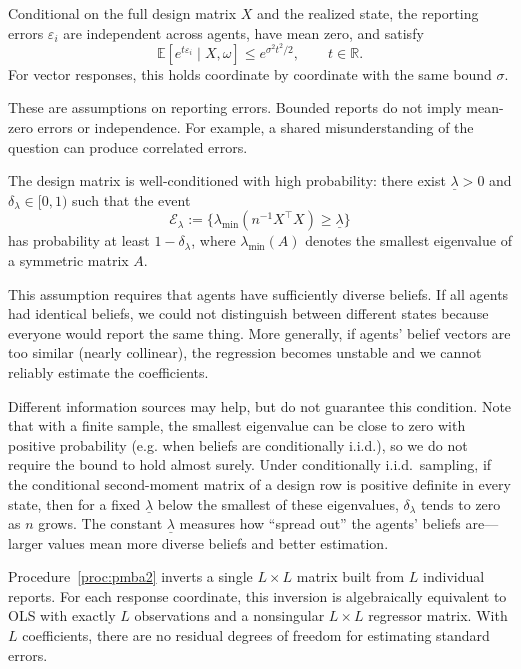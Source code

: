 \documentclass[12pt,reqno]{amsart}
\begin{document}
\begin{assumption}\label{ass:linear:subG}
Conditional on the full design matrix $X$ and the realized state, the reporting errors $\varepsilon_i$ are independent across agents, have mean zero, and satisfy
\[
\mathbb E[e^{t\varepsilon_i}\mid X,\omega]\leq e^{\sigma^2t^2/2},\qquad t\in\mathbb R.
\]
For vector responses, this holds coordinate by coordinate with the same bound $\sigma$.
\end{assumption}

These are assumptions on reporting errors. Bounded reports do not imply
mean-zero errors or independence. For example, a shared misunderstanding of
the question can produce correlated errors.

\begin{assumption}\label{ass:linear:LCLN}
The design matrix is well-conditioned with high probability: there exist $\underline\lambda>0$ and $\delta_\lambda\in[0,1)$ such that the event
\[
\mathcal{E}_\lambda:=\bigl\{\lambda_{\min}\!\left(n^{-1}X^{\top}X\right)\ge \underline\lambda\bigr\}
\]
has probability at least $1-\delta_\lambda$, where $\lambda_{\min}(A)$ denotes the smallest eigenvalue of a symmetric matrix $A$.
\end{assumption}

This assumption requires that agents have sufficiently diverse beliefs. If
all agents had identical beliefs, we could not distinguish between different
states because everyone would report the same thing. More generally, if
agents' belief vectors are too similar (nearly collinear), the regression
becomes unstable and we cannot reliably estimate the coefficients.

Different information sources may help, but do not guarantee this condition. Note that with a finite sample, the smallest eigenvalue can be close to zero with positive probability (e.g. when beliefs are conditionally i.i.d.), so we do not require the bound to hold almost surely. Under conditionally i.i.d.\ sampling, if the conditional second-moment matrix of a design row is positive definite in every state, then for a fixed $\underline\lambda$ below the smallest of these eigenvalues, $\delta_\lambda$ tends to zero as $n$ grows.
The constant $\underline\lambda$ measures how ``spread out'' the agents'
beliefs are---larger values mean more diverse beliefs and better estimation.

\begin{remark}\label{rem:minimal}
\begingroup
Procedure~\ref{proc:pmba2} inverts a single $L\times L$ matrix built
from $L$ individual reports. For each response coordinate, this inversion is algebraically equivalent to
OLS with exactly $L$ observations and a nonsingular $L\times L$ regressor matrix.
With $L$ coefficients, there are no residual degrees of freedom for estimating standard errors.
\par\endgroup
\end{remark}
\end{document}
